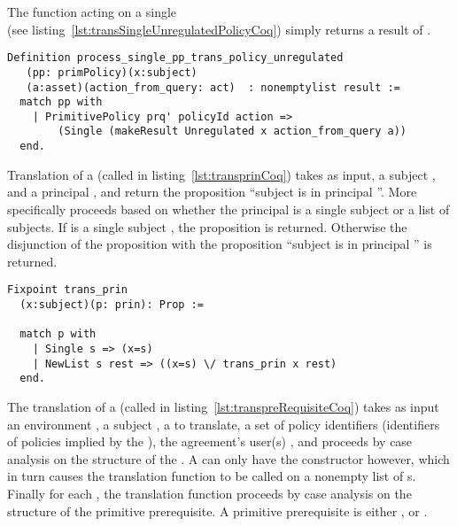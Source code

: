 The function  acting on a single \\  (see listing~\ref{lst:transSingleUnregulatedPolicyCoq}) simply returns a result of .



\begin{lstlisting}
Definition process_single_pp_trans_policy_unregulated
   (pp: primPolicy)(x:subject)
   (a:asset)(action_from_query: act)  : nonemptylist result :=
  match pp with
    | PrimitivePolicy prq' policyId action =>
        (Single (makeResult Unregulated x action_from_query a))
  end.
\end{lstlisting}




Translation of a  (called  in listing~\ref{lst:transprinCoq}) takes as input, a subject , and a principal , and return the proposition ``subject  is in principal ''. More specifically  proceeds based on whether the principal  is a single subject or a list of subjects. If  is a single subject , the proposition  is returned. Otherwise the disjunction of the proposition  with the proposition ``subject  is in principal '' is returned.

\begin{minipage}{\linewidth}
\begin{lstlisting}
Fixpoint trans_prin
  (x:subject)(p: prin): Prop :=

  match p with
    | Single s => (x=s)
    | NewList s rest => ((x=s) \/ trans_prin x rest)
  end.
\end{lstlisting}
\end{minipage}


The translation of a  (called  in listing~\ref{lst:transpreRequisiteCoq}) takes as input an environment , a subject , a   to translate, a set of policy identifiers  (identifiers of policies implied by the ), the agreement's user(s) , and proceeds by case analysis on the structure of the . A  can only have the constructor  however, which in turn causes the translation function  to be called on a nonempty list of s. Finally for each , the translation function  proceeds by case analysis on the structure of the primitive prerequisite. A primitive prerequisite is either ,  or .

